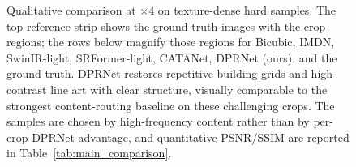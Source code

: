 \begin{figure}[H]
\centering
{}\hfill
{}\hfill
{}

\vspace{3pt}

\vspace{3pt}

\vspace{3pt}

\caption{Qualitative comparison at $\times4$ on texture-dense hard samples. The
top reference strip shows the ground-truth images with the crop regions; the rows
below magnify those regions for Bicubic, IMDN, SwinIR-light, SRFormer-light,
CATANet, DPRNet (ours), and the ground truth. DPRNet restores repetitive building
grids and high-contrast line art with clear structure, visually comparable to the
strongest content-routing baseline on these challenging crops. The samples are
chosen by high-frequency content rather than by per-crop DPRNet advantage, and
quantitative PSNR/SSIM are reported in Table~\ref{tab:main_comparison}.}
\label{fig:visual}
\end{figure}
